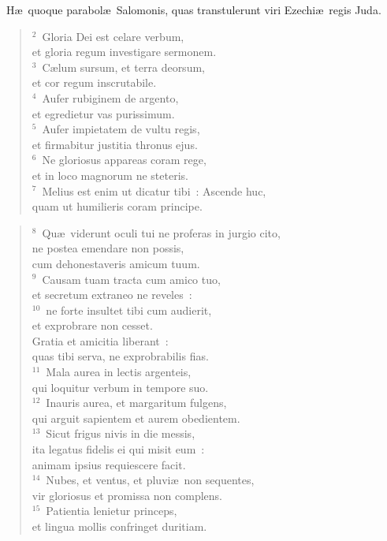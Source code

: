~H\ae\ quoque parabol\ae\ Salomonis, quas transtulerunt viri Ezechi\ae\ regis Juda.
\begin{flushleft}\begin{verse}\vspace{6pt}${}^{2}$~Gloria Dei est celare verbum,\\ et gloria regum investigare sermonem.\\
${}^{3}$~C\ae lum sursum, et terra deorsum,\\ et cor regum inscrutabile.\\
${}^{4}$~Aufer rubiginem de argento,\\ et egredietur vas purissimum.\\
${}^{5}$~Aufer impietatem de vultu regis,\\ et firmabitur justitia thronus ejus.\\
${}^{6}$~Ne gloriosus appareas coram rege,\\ et in loco magnorum ne steteris.\\
${}^{7}$~Melius est enim ut dicatur tibi~: Ascende huc,\\ quam ut humilieris coram principe.\end{verse}\end{flushleft}


\begin{flushleft}\begin{verse}${}^{8}$~Qu\ae\ viderunt oculi tui ne proferas in jurgio cito,\\ ne postea emendare non possis,\\ cum dehonestaveris amicum tuum.\\
${}^{9}$~Causam tuam tracta cum amico tuo,\\ et secretum extraneo ne reveles~:\\
${}^{10}$~ne forte insultet tibi cum audierit,\\ et exprobrare non cesset.\\ Gratia et amicitia liberant~:\\ quas tibi serva, ne exprobrabilis fias.\\
${}^{11}$~Mala aurea in lectis argenteis,\\ qui loquitur verbum in tempore suo.\\
${}^{12}$~Inauris aurea, et margaritum fulgens,\\ qui arguit sapientem et aurem obedientem.\\
${}^{13}$~Sicut frigus nivis in die messis,\\ ita legatus fidelis ei qui misit eum~:\\ animam ipsius requiescere facit.\\
${}^{14}$~Nubes, et ventus, et pluvi\ae\ non sequentes,\\ vir gloriosus et promissa non complens.\\
${}^{15}$~Patientia lenietur princeps,\\ et lingua mollis confringet duritiam.\end{verse}\end{flushleft}


